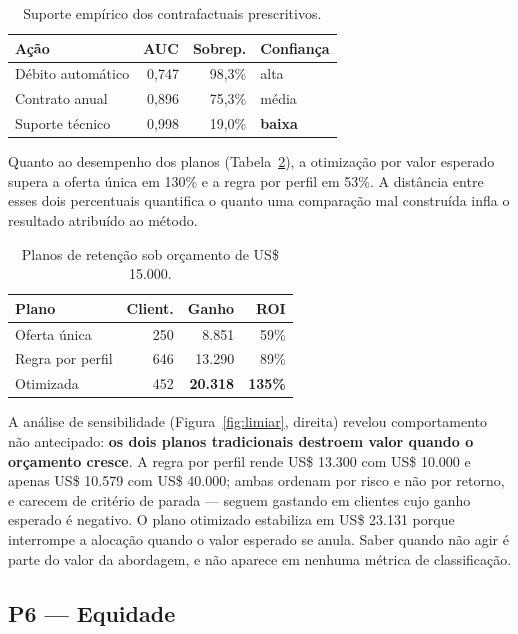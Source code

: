 \documentclass[10pt,a4paper]{article}
\begin{document}
\begin{table}[t]
\centering
\small
\caption{Suporte empírico dos contrafactuais prescritivos.}
\label{tab:suporte}
\begin{tabular}{@{}lrrl@{}}
\toprule
\textbf{Ação} & \textbf{AUC} & \textbf{Sobrep.} & \textbf{Confiança} \\
\midrule
Débito automático & 0,747 & 98,3\% & alta \\
Contrato anual    & 0,896 & 75,3\% & média \\
Suporte técnico   & 0,998 & 19,0\% & \textbf{baixa} \\
\bottomrule
\end{tabular}
\end{table}

Quanto ao desempenho dos planos (Tabela~\ref{tab:prescricao}), a otimização por valor
esperado supera a oferta única em 130\% e a regra por perfil em 53\%. A distância entre
esses dois percentuais quantifica o quanto uma comparação mal construída infla o
resultado atribuído ao método.

\begin{table}[t]
\centering
\small
\caption{Planos de retenção sob orçamento de US\$ 15.000.}
\label{tab:prescricao}
\begin{tabular}{@{}lrrr@{}}
\toprule
\textbf{Plano} & \textbf{Client.} & \textbf{Ganho} & \textbf{ROI} \\
\midrule
Oferta única      & 250 & 8.851  & 59\%  \\
Regra por perfil  & 646 & 13.290 & 89\%  \\
Otimizada         & 452 & \textbf{20.318} & \textbf{135\%} \\
\bottomrule
\end{tabular}
\end{table}

A análise de sensibilidade (Figura~\ref{fig:limiar}, direita) revelou comportamento não
antecipado: \textbf{os dois planos tradicionais destroem valor quando o orçamento cresce}. A
regra por perfil rende US\$ 13.300 com US\$ 10.000 e apenas US\$ 10.579 com US\$ 40.000;
ambas ordenam por risco e não por retorno, e carecem de critério de parada --- seguem gastando
em clientes cujo ganho esperado é negativo. O plano otimizado estabiliza em US\$ 23.131 porque
interrompe a alocação quando o valor esperado se anula. Saber quando não agir é parte do valor
da abordagem, e não aparece em nenhuma métrica de classificação.


\subsection{P6 --- Equidade}
\end{document}
